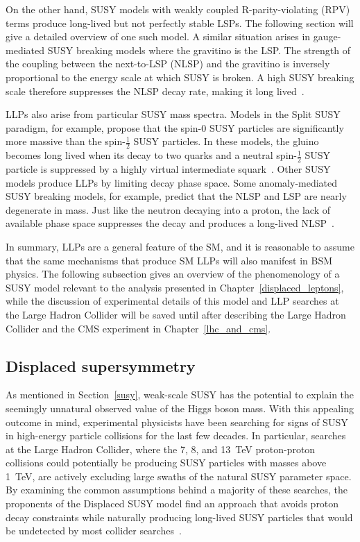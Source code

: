 On the other hand, SUSY models with weakly coupled R-parity-violating (RPV) terms produce long-lived but not perfectly stable LSPs. The following section will give a detailed overview of one such model. A similar situation arises in gauge-mediated SUSY breaking models where the gravitino is the LSP. The strength of the coupling between the next-to-LSP (NLSP) and the gravitino is inversely proportional to the energy scale at which SUSY is broken. A high SUSY breaking scale therefore suppresses the NLSP decay rate, making it long lived~\cite{liu_2015}.

LLPs also arise from particular SUSY mass spectra. Models in the Split SUSY paradigm, for example, propose that the spin-0 SUSY particles are significantly more massive than the spin-$\frac{1}{2}$ SUSY particles. In these models, the gluino becomes long lived when its decay to two quarks and a neutral spin-$\frac{1}{2}$ SUSY particle is suppressed by a highly virtual intermediate squark~\cite{split_susy_colliders}. Other SUSY models produce LLPs by limiting decay phase space. Some anomaly-mediated SUSY breaking models, for example, predict that the NLSP and LSP are nearly degenerate in mass. Just like the neutron decaying into a proton, the lack of available phase space suppresses the decay and produces a long-lived NLSP~\cite{amsb_at_lhc}.

In summary, LLPs are a general feature of the SM, and it is reasonable to assume that the same mechanisms that produce SM LLPs will also manifest in BSM physics. The following subsection gives an overview of the phenomenology of a SUSY model relevant to the analysis presented in Chapter~\ref{displaced_leptons}, while the discussion of experimental details of this model and LLP searches at the Large Hadron Collider will be saved until after describing the Large Hadron Collider and the CMS experiment in Chapter~\ref{lhc_and_cms}.

\subsection{Displaced supersymmetry}
\label{displaced_susy}
As mentioned in Section~\ref{susy}, weak-scale SUSY has the potential to explain the seemingly unnatural observed value of the Higgs boson mass. With this appealing outcome in mind, experimental physicists have been searching for signs of SUSY in high-energy particle collisions for the last few decades. In particular, searches at the Large Hadron Collider, where the \num{7}, \num{8}, and \SI{13}{\TeV} proton-proton collisions could potentially be producing SUSY particles with masses above \SI{1}{\TeV}, are actively excluding large swaths of the natural SUSY parameter space. By examining the common assumptions behind a majority of these searches, the proponents of the Displaced SUSY model find an approach that avoids proton decay constraints while naturally producing long-lived SUSY particles that would be undetected by most collider searches~\cite{displaced_susy}.

